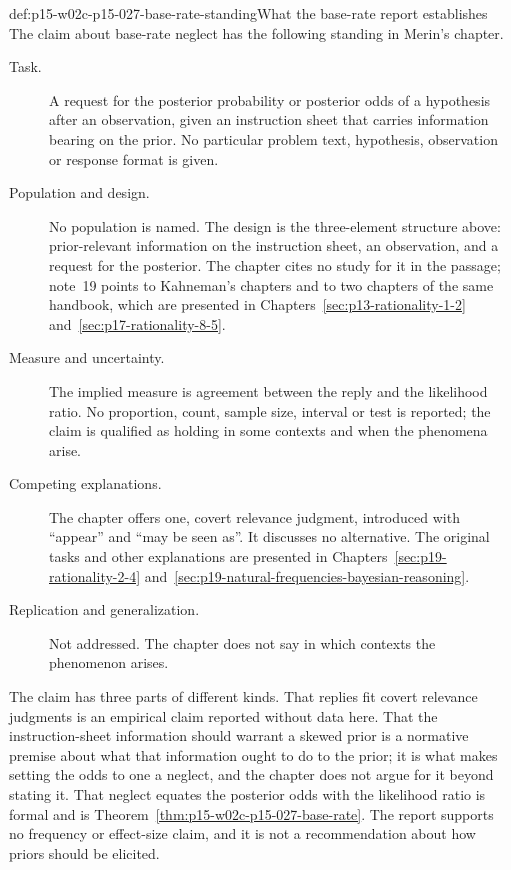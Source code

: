 \begin{hbwarning}{def:p15-w02c-p15-027-base-rate-standing}{What the base-rate report establishes}
The claim about base-rate neglect has the following standing in Merin's
chapter.
\begin{description}
\item[Task.] A request for the posterior probability or posterior odds of
  a hypothesis after an observation, given an instruction sheet that
  carries information bearing on the prior. No particular problem text,
  hypothesis, observation or response format is given.
\item[Population and design.] No population is named. The design is the
  three-element structure above: prior-relevant information on the
  instruction sheet, an observation, and a request for the posterior.
  The chapter cites no study for it in the passage; note~19 points to
  Kahneman's chapters and to two chapters of the same handbook, which are
  presented in Chapters~\ref{sec:p13-rationality-1-2}
  and~\ref{sec:p17-rationality-8-5}.
\item[Measure and uncertainty.] The implied measure is agreement between
  the reply and the likelihood ratio. No proportion, count, sample size,
  interval or test is reported; the claim is qualified as holding in
  some contexts and when the phenomena arise.
\item[Competing explanations.] The chapter offers one, covert relevance
  judgment, introduced with ``appear'' and ``may be seen as''. It
  discusses no alternative. The original tasks and other explanations
  are presented in Chapters~\ref{sec:p19-rationality-2-4}
  and~\ref{sec:p19-natural-frequencies-bayesian-reasoning}.
\item[Replication and generalization.] Not addressed. The chapter does
  not say in which contexts the phenomenon arises.
\end{description}
The claim has three parts of different kinds. That replies fit covert
relevance judgments is an empirical claim reported without data here.
That the instruction-sheet information should warrant a skewed prior is
a normative premise about what that information ought to do to the
prior; it is what makes setting the odds to one a neglect, and the
chapter does not argue for it beyond stating it. That neglect equates
the posterior odds with the likelihood ratio is formal and is
Theorem~\ref{thm:p15-w02c-p15-027-base-rate}. The report supports no
frequency or effect-size claim, and it is not a recommendation about how
priors should be elicited.
\end{hbwarning}

